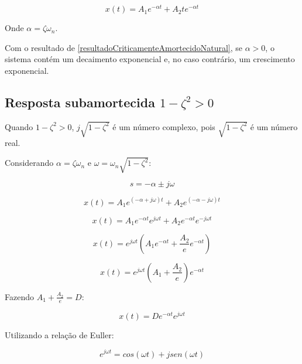 \documentclass[12pt,fleqn]{book} %
\begin{document}
{\begin{equation}\label{resultadoCriticamenteAmortecidoNatural}
x(t) = A_1e^{-\alpha t} + A_2te^{-\alpha t}
\end{equation}

Onde $\alpha = \zeta\omega_n$.

Com o resultado de \ref{resultadoCriticamenteAmortecidoNatural}, se $\alpha > 0$, o sistema contém um decaimento exponencial e, no caso contrário, um crescimento exponencial.

\subsection{Resposta subamortecida $1-\zeta^2 > 0$}

Quando $1-\zeta^2 > 0$, $j\sqrt{1-\zeta^2}$ é um número complexo, pois $\sqrt{1-\zeta^2}$ é um número real.

Considerando $\alpha = \zeta\omega_n$ e $\omega = \omega_n\sqrt{1-\zeta^2}$:

\begin{equation}
s = -\alpha \pm j\omega
\end{equation}

\begin{equation}
x(t) = A_1e^{(-\alpha + j\omega)t} + A_2e^{(-\alpha - j\omega)t}
\end{equation}

\begin{equation}
x(t) = A_1e^{-\alpha t}e^{j\omega t} + A_2e^{-\alpha t}e^{-j\omega t}
\end{equation}

\begin{equation}
x(t) = e^{j\omega t}(A_1e^{-\alpha t}+ \frac{A_2}{e}e^{-\alpha t})
\end{equation}

\begin{equation}
x(t) = e^{j\omega t}(A_1+\frac{A_2}{e})e^{-\alpha t}
\end{equation}

Fazendo $A_1+\frac{A_2}{e} = D$:

\begin{equation}
x(t) = De^{-\alpha t}e^{j\omega t}
\end{equation}

Utilizando a relação de Euller:

\begin{equation}
e^{j\omega t} = cos(\omega t) + jsen(\omega t)
\end{equation}

}
\end{document}
